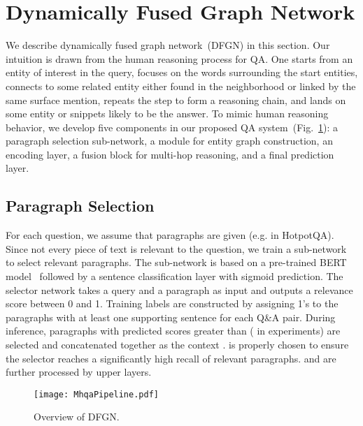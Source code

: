 \documentclass[11pt,a4paper]{article}
\newcommand{\hotpotqa}{HotpotQA\xspace}
\newcommand{\method}{DFGN\xspace}
\begin{document}
\section{Dynamically Fused Graph Network}
\label{sec:method}
We describe dynamically fused graph network~(\method) in this section.
Our intuition is drawn from the human reasoning process for QA. 
One starts from an entity of interest in the query, 
focuses on the words surrounding the start entities, 
connects to some related entity either found in the neighborhood 
or linked by the same surface mention, 
repeats the step to form a reasoning chain, 
and lands on some entity or snippets likely to be the answer. 
To mimic human reasoning behavior, we develop five components 
in our proposed QA system~(Fig.~\ref{fig:dfgn-system}): a paragraph selection sub-network, a module for entity graph construction, an encoding layer, 
a fusion block for multi-hop reasoning, and a final prediction layer.



\subsection{Paragraph Selection} 
For each question, we assume that  paragraphs are given
(e.g.  in \hotpotqa). 
Since not every piece of text is relevant to the question, 
we train a sub-network to select relevant paragraphs. 
The sub-network is based on a pre-trained BERT model~\cite{devlin2018bert}
followed by a sentence classification layer with sigmoid prediction.
The selector network takes a query  and a paragraph as input and outputs a relevance score between 0 and 1. 
Training labels are constructed by assigning 1's to the paragraphs with at least one supporting sentence for each Q\&A pair.
During inference, paragraphs with predicted scores greater than  ( in experiments) are selected and concatenated together as the context . 
 is properly chosen to ensure the selector reaches a significantly high recall of relevant paragraphs. 
 and  are further processed by upper layers. 

\begin{figure}[tb]
\centering
\texttt{[image: MhqaPipeline.pdf]}
\caption{Overview of \method.}
\label{fig:dfgn-system}
\end{figure}
\end{document}
